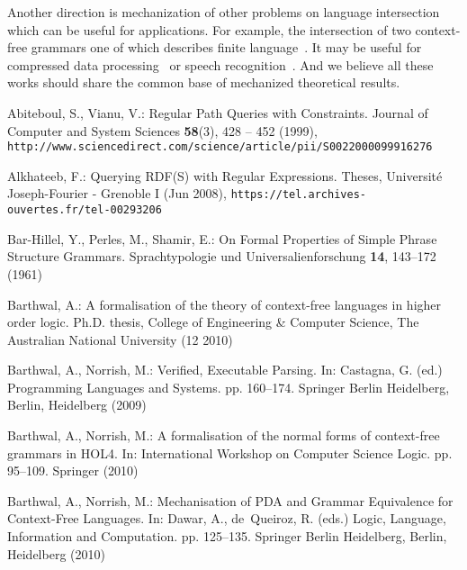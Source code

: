 \documentclass[runningheads]{llncs}
\begin{document}
Another direction is mechanization of other problems on language intersection which can be useful for applications.
For example, the intersection of two context-free grammars one of which describes finite language~\cite{nederhof2002parsing,nederhof2004language}.
It may be useful for compressed data processing~\cite{Lohrey2012AlgorithmicsOS} or speech recognition~\cite{Nederhof:2002:PNC:1073083.1073104,NEDERHOF2004172}.
And we believe all these works should share the common base of mechanized theoretical results.

%
%
%
 
 \begin{thebibliography}{10}
 \providecommand{\url}[1]{\texttt{#1}}
 \providecommand{\urlprefix}{URL }
 \providecommand{\doi}[1]{https://doi.org/#1}

 Abiteboul, S., Vianu, V.: {Regular Path Queries with Constraints}. Journal of
   Computer and System Sciences  \textbf{58}(3),  428 -- 452 (1999),
   \url{http://www.sciencedirect.com/science/article/pii/S0022000099916276}

 Alkhateeb, F.: {Querying RDF(S) with Regular Expressions}. Theses,
   {Universit{\'e} Joseph-Fourier - Grenoble I} (Jun 2008),
   \url{https://tel.archives-ouvertes.fr/tel-00293206}

 Bar-Hillel, Y., Perles, M., Shamir, E.: {On Formal Properties of Simple Phrase
   Structure Grammars}. {Sprachtypologie und Universalienforschung}
   \textbf{14},  143--172 (1961)

 Barthwal, A.: {A formalisation of the theory of context-free languages in
   higher order logic}. Ph.D. thesis, {College of Engineering \& Computer
   Science, The Australian National University} (12 2010)

 Barthwal, A., Norrish, M.: {Verified, Executable Parsing}. In: Castagna, G.
   (ed.) Programming Languages and Systems. pp. 160--174. Springer Berlin
   Heidelberg, Berlin, Heidelberg (2009)

 Barthwal, A., Norrish, M.: A formalisation of the normal forms of context-free
   grammars in {HOL4}. In: International Workshop on Computer Science Logic. pp.
   95--109. Springer (2010)

 Barthwal, A., Norrish, M.: {Mechanisation of PDA and Grammar Equivalence for
   Context-Free Languages}. In: Dawar, A., de~Queiroz, R. (eds.) {Logic,
   Language, Information and Computation}. pp. 125--135. Springer Berlin
   Heidelberg, Berlin, Heidelberg (2010)


\end{thebibliography}
\end{document}
